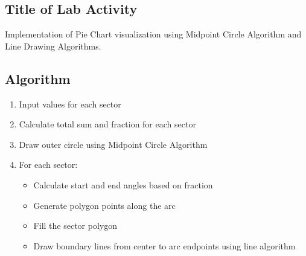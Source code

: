 \documentclass[12pt,a4paper]{article}
\begin{document}
\subsection{Title of Lab Activity}
Implementation of Pie Chart visualization using Midpoint Circle Algorithm and Line Drawing Algorithms.

\subsection{Algorithm}
\begin{enumerate}
    \item Input values for each sector
    \item Calculate total sum and fraction for each sector
    \item Draw outer circle using Midpoint Circle Algorithm
    \item For each sector:
    \begin{itemize}
        \item Calculate start and end angles based on fraction
        \item Generate polygon points along the arc
        \item Fill the sector polygon
        \item Draw boundary lines from center to arc endpoints using line algorithm
    \end{itemize}
\end{enumerate}
\end{document}
